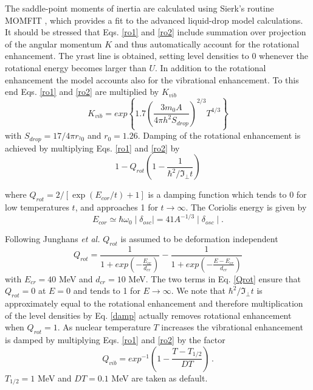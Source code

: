 \documentclass[twocolumn,amsmath,amssymb,10pt,groupedaddress,letter]{revtex4}
\begin{document}
The saddle-point moments of inertia are calculated using Sierk's routine
MOMFIT \cite{sierk}, which provides a fit to the advanced liquid-drop
model calculations.
It should be stressed that Eqs. \ref{ro1} and \ref{ro2} include
summation over projection of the angular momentum $K$ and thus automatically
account for the rotational enhancement. The yrast line is obtained,
setting level densities to 0 whenever the
rotational energy becomes larger than $U$. In addition to the rotational
enhancement the model accounts also for the vibrational enhancement.
To this end Eqs. \ref{ro1} and
\ref{ro2} are multiplied by $K_{vib}$
\begin{equation}
K_{vib}=exp\left\{ 1.7\left(\frac{3m_{0}A}{4\pi h^{2}S_{drop}}\right)^{2/3}T^{4/3}\right\} \label{Kvib}
\end{equation}
with $S_{drop}=17/4\pi r_{^{2}0}$ and $r_{0}=1.26$.
Damping of the rotational enhancement is achieved by multiplying Eqs.
\ref{ro1} and \ref{ro2} by
\begin{equation}
1-Q_{rot}\left(1-\frac{1}{\hbar^{2}/\Im_{\bot}t}\right)\label{damp}
\end{equation}

\noindent where $Q_{rot}=2/\left[\exp(E_{cor}/t)+1\right]$ is a damping function
which tends to 0 for low temperatures $t$, and approaches 1 for $t\rightarrow\infty$.
The Coriolis energy is given by
\begin{equation}
E_{cor}\simeq\hbar\omega_{0}\mid\delta_{osc}\mid=41A^{-1/3}\mid\delta_{osc}\mid.\label{Coriolis}
\end{equation}


\noindent Following Junghans \emph{et al.} \cite{Ignadamp} $Q_{rot}$
is assumed to be deformation independent
\begin{equation}
Q_{rot}=\frac{1}{1+exp\left(-\frac{E_{cr}}{d_{cr}}\right)}-\frac{1}{1+exp\left(-\frac{E-E_{cr}}{d_{cr}}\right)}\label{Qrot}
\end{equation}
 \noindent with $E_{cr}=40$ MeV and $d_{cr}=10$ MeV. The two terms
in Eq. \ref{Qrot} ensure that $Q_{rot}=0$ at $E=0$ and tends to
1 for $E\rightarrow\infty$. We note that $\hbar^{2}/\Im_{\bot}t$
is approximately equal to the rotational enhancement and therefore
multiplication of the level densities by Eq.
\ref{damp} actually removes rotational enhancement when $Q_{rot}=1$.
As nuclear temperature $T$ increases the vibrational enhancement
is damped by multiplying Eqs. \ref{ro1} and \ref{ro2} by the factor
\begin{equation}
Q_{vib}=exp^{-1}\left(1-\frac{T-T_{1/2}}{DT}\right)\,.\label{Qvib}
\end{equation}
 $T_{1/2}=1$ MeV and $DT=0.1$ MeV are taken as default.
\end{document}
